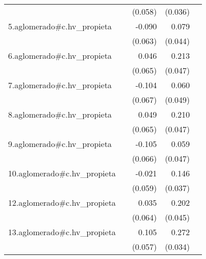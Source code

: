{\begin{longtable}{l*{4}{D{.}{.}{-1}}}
            &                     &     (0.058)         &     (0.036)         &                     \\
\addlinespace
5.aglomerado#c.hv\_propieta&                     &      -0.090         &       0.079         &                     \\
            &                     &     (0.063)         &     (0.044)         &                     \\
\addlinespace
6.aglomerado#c.hv\_propieta&                     &       0.046         &       0.213\sym{***}&                     \\
            &                     &     (0.065)         &     (0.047)         &                     \\
\addlinespace
7.aglomerado#c.hv\_propieta&                     &      -0.104         &       0.060         &                     \\
            &                     &     (0.067)         &     (0.049)         &                     \\
\addlinespace
8.aglomerado#c.hv\_propieta&                     &       0.049         &       0.210\sym{***}&                     \\
            &                     &     (0.065)         &     (0.047)         &                     \\
\addlinespace
9.aglomerado#c.hv\_propieta&                     &      -0.105         &       0.059         &                     \\
            &                     &     (0.066)         &     (0.047)         &                     \\
\addlinespace
10.aglomerado#c.hv\_propieta&                     &      -0.021         &       0.146\sym{***}&                     \\
            &                     &     (0.059)         &     (0.037)         &                     \\
\addlinespace
12.aglomerado#c.hv\_propieta&                     &       0.035         &       0.202\sym{***}&                     \\
            &                     &     (0.064)         &     (0.045)         &                     \\
\addlinespace
13.aglomerado#c.hv\_propieta&                     &       0.105         &       0.272\sym{***}&                     \\
            &                     &     (0.057)         &     (0.034)         &                     \\

\end{longtable}}
